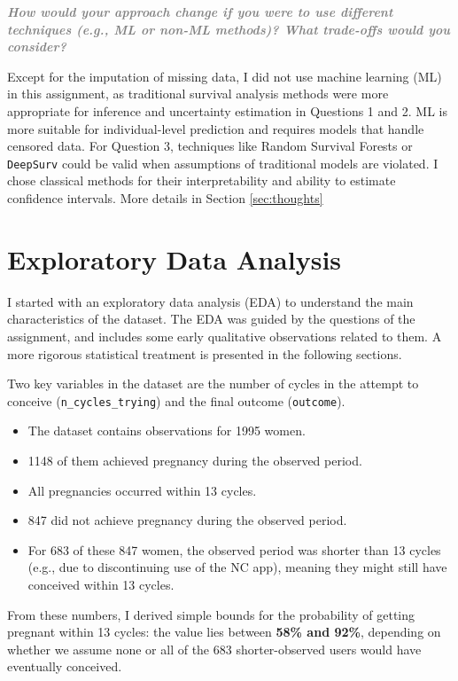 \documentclass[11pt]{article}
\newcommand{\questiontext}[1]{\vspace{0.5em}\textbf{\textit{\textcolor{gray}{#1}}}}
\begin{document}
\questiontext{How would your approach change if you were to use different techniques (e.g., ML or non-ML methods)? What trade-offs would you consider?}

Except for the imputation of missing data, I did not use machine learning (ML) in this assignment, as traditional survival analysis methods were more appropriate for inference and uncertainty estimation in Questions 1 and 2. ML is more suitable for individual-level prediction and requires models that handle censored data. For Question 3, techniques like Random Survival Forests or \texttt{DeepSurv} could be valid when assumptions of traditional models are violated. I chose classical methods for their interpretability and ability to estimate confidence intervals. More details in Section \ref{sec:thoughts}

\vspace{1em}


\section{Exploratory Data Analysis}
\label{sec:eda}

I started with an exploratory data analysis (EDA) to understand the main characteristics of the dataset. The EDA was guided by the questions of the assignment, and includes some early qualitative observations related to them. A more rigorous statistical treatment is presented in the following sections.

Two key variables in the dataset are the number of cycles in the attempt to conceive (\texttt{n\_cycles\_trying}) and the final outcome (\texttt{outcome}).

\begin{itemize}
    \item The dataset contains observations for 1995 women.
    \item 1148 of them achieved pregnancy during the observed period.
    \item All pregnancies occurred within 13 cycles.
    \item 847 did not achieve pregnancy during the observed period.
    \item For 683 of these 847 women, the observed period was shorter than 13 cycles (e.g., due to discontinuing use of the NC app), meaning they might still have conceived within 13 cycles.
\end{itemize}

From these numbers, I derived simple bounds for the probability of getting pregnant within 13 cycles: the value lies between \textbf{58\% and 92\%}, depending on whether we assume none or all of the 683 shorter-observed users would have eventually conceived.
\end{document}
